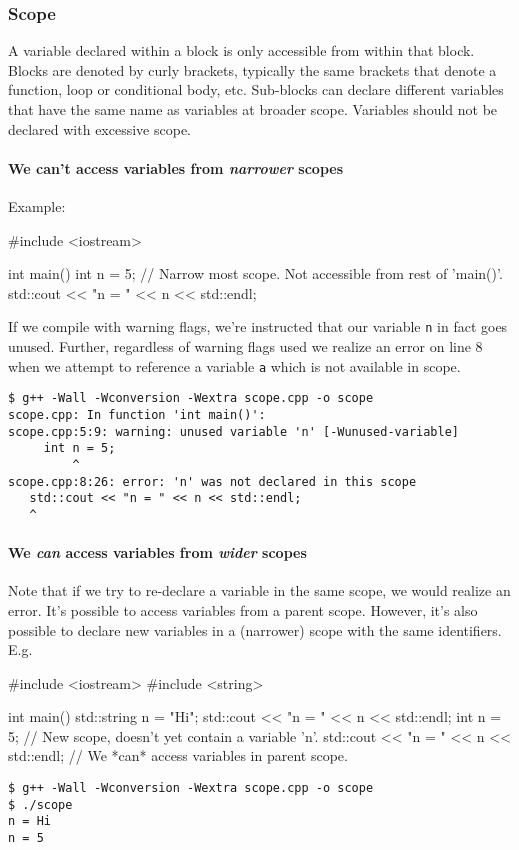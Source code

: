 \documentclass[12pt,letterpaper,twoside]{article}
\begin{document}
\subsubsection{Scope}
A variable declared within a block is only accessible from within that
block.
Blocks are denoted by curly brackets, typically the same brackets that
denote a function, loop or conditional body, etc.
Sub-blocks can declare different variables that have the same name as
variables at broader scope.
Variables should not be declared with excessive scope.

\paragraph{We can't access variables from \emph{narrower} scopes} Example:

\begin{cpp}
#include <iostream>

int main() {
  { int n = 5; }     // Narrow most scope. Not accessible from rest of 'main()'.
  std::cout << "n = " << n << std::endl;
}
\end{cpp}

If we compile with warning flags, we're instructed that our variable
\texttt{n} in fact goes unused. Further, regardless of warning flags
used we realize an error on line 8 when we attempt to reference a
variable \texttt{a} which is not available in scope.
{
  \footnotesize
\begin{verbatim}
$ g++ -Wall -Wconversion -Wextra scope.cpp -o scope
scope.cpp: In function 'int main()':
scope.cpp:5:9: warning: unused variable 'n' [-Wunused-variable]
     int n = 5;
         ^
scope.cpp:8:26: error: 'n' was not declared in this scope
   std::cout << "n = " << n << std::endl;
   ^
\end{verbatim}
}

\paragraph{We \emph{can} access variables from \emph{wider} scopes}
Note that if we try to re-declare a variable in the same scope, we
would realize an error. It's possible to access variables from a
parent scope. However, it's also possible to declare new variables in
a (narrower) scope with the same identifiers. E.g. 
\begin{cpp}
#include <iostream>
#include <string>

int main() {
  std::string n = "Hi";
  std::cout << "n = " << n << std::endl;
  {
    int n = 5;                                  // New scope, doesn't yet contain a variable 'n'.
    { std::cout << "n = " << n << std::endl; }  // We *can* access variables in parent scope.
  }
}
\end{cpp}
{\footnotesize
\begin{verbatim}
$ g++ -Wall -Wconversion -Wextra scope.cpp -o scope
$ ./scope
n = Hi
n = 5
\end{verbatim}
}
\end{document}
